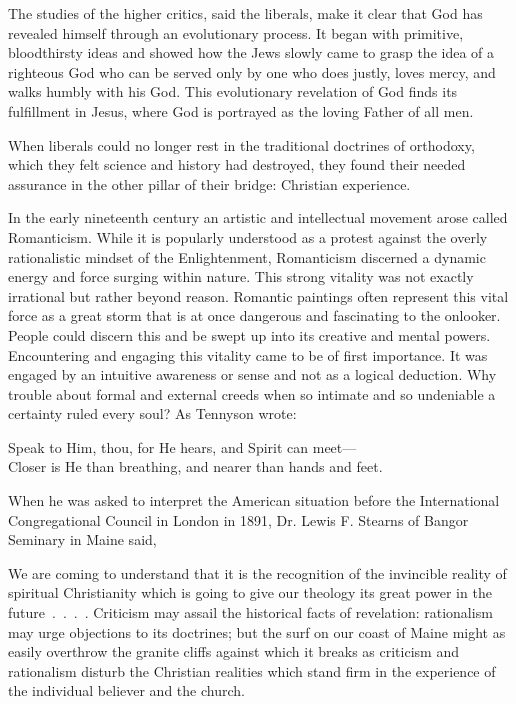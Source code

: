 The studies of the higher critics, said the liberals, make it clear that God has revealed himself
through an evolutionary process. It began with primitive, bloodthirsty ideas and showed how the Jews
slowly came to grasp the idea of a righteous God who can be served only by one who does justly,
loves mercy, and walks humbly with his God. This evolutionary revelation of God finds its
fulfillment in Jesus, where God is portrayed as the loving Father of all men.

When liberals could no longer rest in the traditional doctrines of orthodoxy, which they felt
science and history had destroyed, they found their needed assurance in the other pillar of their
bridge: Christian experience.

In the early nineteenth century an artistic and intellectual movement arose called Romanticism.
While it is popularly understood as a protest against the overly rationalistic mindset of the
Enlightenment, Romanticism discerned a dynamic energy and force surging within nature. This strong
vitality was not exactly irrational but rather beyond reason. Romantic paintings often represent
this vital force as a great storm that is at once dangerous and fascinating to the onlooker. People
could discern this and be swept up into its creative and mental powers. Encountering and engaging
this vitality came to be of first importance. It was engaged by an intuitive awareness or sense and
not as a logical deduction. Why trouble about formal and external creeds when so intimate and so
undeniable a certainty ruled every soul? As Tennyson wrote:

\begin{poem}
Speak to Him, thou, for He hears, and Spirit can meet—\\
Closer is He than breathing, and nearer than hands and feet.
\end{poem}

When he was asked to interpret the American situation before the International Congregational
Council in London in 1891, Dr. Lewis F. Stearns of Bangor Seminary in Maine said,

\begin{blockquote}
We are coming to understand that it is the recognition of the invincible reality of spiritual
Christianity which is going to give our theology its great power in the future~.~.~.~. Criticism may
assail the historical facts of revelation: rationalism may urge objections to its doctrines; but the
surf on our coast of Maine might as easily overthrow the granite cliffs against which it breaks as
criticism and rationalism disturb the Christian realities which stand firm in the experience of the
individual believer and the church.
\end{blockquote}

